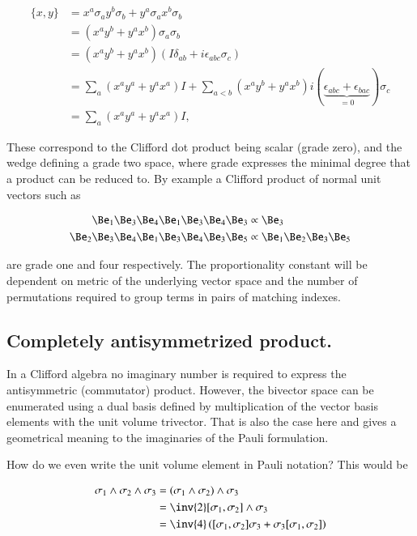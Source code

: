 \documentclass{article}
\newcommand{\symmetric}[2]{{\{{#1},{#2}\}}}
\newcommand{\antisymmetric}[2]{[{#1},{#2}]}
\begin{document}
\begin{align*}
\symmetric{x}{y} 
&= x^a \sigma_a y^b \sigma_b + y^a \sigma_a x^b \sigma_b \\
&= (x^a y^b + y^a x^b) \sigma_a \sigma_b \\
&= (x^a y^b + y^a x^b) ( I \delta_{a b} + i \epsilon_{a b c} \sigma_c) \\
&= \sum_a (x^a y^a + y^a x^a) I  
+\sum_{a<b}(x^a y^b + y^a x^b) i (\underbrace{\epsilon_{a b c} + \epsilon_{b a c}}_{=0}) \sigma_c \\
&= \sum_a (x^a y^a + y^a x^a) I,
\end{align*}

These correspond to the Clifford dot product being scalar (grade zero), and the wedge defining a grade two space, where grade expresses the minimal degree that a product can be reduced to.  By example a Clifford product of normal unit vectors such as

\begin{align*}
\Be_1 \Be_3 \Be_4 \Be_1 \Be_3 \Be_4 \Be_3 &\propto \Be_3 \\
\Be_2 \Be_3 \Be_4 \Be_1 \Be_3 \Be_4 \Be_3 \Be_5 &\propto \Be_1 \Be_2 \Be_3 \Be_5
\end{align*}

are grade one and four respectively.  The proportionality constant will be dependent on metric of the underlying vector space and the number of permutations required to group terms in pairs of matching indexes.

\subsection{ Completely antisymmetrized product. }

In a Clifford algebra no imaginary number is required to express the antisymmetric (commutator) product.  However, the bivector space can be enumerated using a dual basis defined by multiplication of the vector basis elements with the unit volume trivector.  That is also the case here and gives a geometrical meaning to the imaginaries of the Pauli formulation.

How do we even write the unit volume element in Pauli notation?  This would be

\begin{align*}
\sigma_1 \wedge \sigma_2 \wedge \sigma_3 
&= (\sigma_1 \wedge \sigma_2) \wedge \sigma_3 \\
&= \inv{2} \antisymmetric{\sigma_1}{\sigma_2} \wedge \sigma_3 \\
&= \inv{4} \left( \antisymmetric{\sigma_1}{\sigma_2} \sigma_3 + \sigma_3 \antisymmetric{\sigma_1}{\sigma_2} \right) \\
\end{align*}
\end{document}
